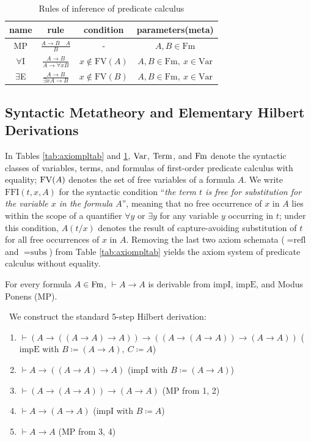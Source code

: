 \documentclass[10pt,a4paper]{article}
\begin{document}
\begin{table}[H]
\centering
\caption{Rules of inference of predicate calculus}
\label{tab:rulestab}
\begin{tabular}{|c|c|c|c|}
\hline
name & rule & condition & parameters(meta) \\ \hline
\hline
MP & \rule[-2.5ex]{0pt}{7ex} $\frac{A\to B\quad A}{B}$ & - & $A,B \in \textrm{Fm}$ \\ \hline
\hline
\rule[-2.5ex]{0pt}{7ex}
$\forall$I & $\frac{A\to B}{A\to \forall x B}$ & $x \notin \textrm{FV}(A)$ & $A,B \in \textrm{Fm},\ x \in \textrm{Var}$ \\ \hline
\hline
\rule[-2.5ex]{0pt}{7ex}
$\exists$E & $\frac{A\to B}{\exists x A\to B}$ & $x \notin \textrm{FV}(B)$ & $A,B \in \textrm{Fm},\ x \in \textrm{Var}$ \\ \hline
\end{tabular}
\end{table}

\subsection{Syntactic Metatheory and Elementary Hilbert Derivations}
In Tables \ref{tab:axiompltab} and \ref{tab:rulestab}, ${\textrm{Var}}$, ${\textrm{Term}}$, and ${\textrm{Fm}}$ denote the syntactic classes of variables, terms, and formulas of first-order predicate calculus with equality; ${\textrm{FV}}(A)$ denotes the set of free variables of a formula $A$. We write $\textrm{FFI}(t,x,A)$ for the syntactic condition ``\emph{the term $t$ is free for substitution for the variable $x$ in the formula $A$}'', meaning that no free occurrence of $x$ in $A$ lies within the scope of a quantifier $\forall y$ or $\exists y$ for any variable $y$ occurring in $t$; under this condition, $A(t/x)$ denotes the result of capture-avoiding substitution of $t$ for all free occurrences of $x$ in $A$. Removing the last two axiom schemata ($=\textrm{refl}$ and $=\textrm{subs}$) from Table \ref{tab:axiompltab} yields the axiom system of predicate calculus without equality.

\begin{lemma}
For every formula $A \in {\textrm{Fm}}$, $\vdash A \to A$ is derivable from $\textrm{impI}$, $\textrm{impE}$, and Modus Ponens ($\textrm{MP}$).
\end{lemma}
\myprf\ We construct the standard 5-step Hilbert derivation:
\begin{enumerate}
\item $\vdash (A \to ((A \to A) \to A)) \to ((A \to (A \to A)) \to (A \to A))$ \hfill ($\textrm{impE}$ with $B \coloneqq (A \to A),\ C \coloneqq A$)
\item $\vdash A \to ((A \to A) \to A)$ \hfill ($\textrm{impI}$ with $B \coloneqq (A \to A)$)
\item $\vdash (A \to (A \to A)) \to (A \to A)$ \hfill ($\textrm{MP}$ from 1, 2)
\item $\vdash A \to (A \to A)$ \hfill ($\textrm{impI}$ with $B \coloneqq A$)
\item $\vdash A \to A$ \hfill ($\textrm{MP}$ from 3, 4)
\end{enumerate}
\myqed
\end{document}
